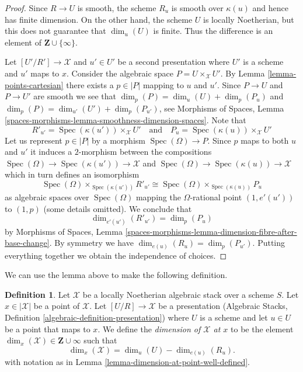 \documentclass{stacks-project}
\theoremstyle{plain}
\theoremstyle{definition}
\newtheorem{definition}[subsection]{Definition}
\theoremstyle{remark}
\numberwithin{equation}{subsection}
\def\Spec{\mathop{\mathrm{Spec}}}
\begin{document}
\begin{proof}
Since $R \to U$ is smooth, the scheme $R_u$ is smooth over $\kappa(u)$
and hence has finite dimension. On the other hand, the scheme $U$
is locally Noetherian, but this does not guarantee that
$\dim_u(U)$ is finite. Thus the difference is an element of
$\mathbf{Z} \cup \{\infty\}$.

\medskip\noindent
Let $[U'/R'] \to \mathcal{X}$ and $u' \in U'$ be a second presentation
where $U'$ is a scheme and $u'$ maps to $x$. Consider the algebraic
space $P = U \times_\mathcal{X} U'$. By
Lemma \ref{lemma-points-cartesian} there exists a $p \in |P|$ mapping to
$u$ and $u'$. Since $P \to U$ and $P \to U'$ are smooth we see that
$\dim_p(P) = \dim_u(U) + \dim_p(P_u)$ and
$\dim_p(P) = \dim_{u'}(U') + \dim_p(P_{u'})$, see
Morphisms of Spaces, Lemma
\ref{spaces-morphisms-lemma-smoothness-dimension-spaces}.
Note that
$$
R'_{u'} = \Spec(\kappa(u')) \times_\mathcal{X} U'
\quad\text{and}\quad
P_u = \Spec(\kappa(u)) \times_\mathcal{X} U'
$$
Let us represent $p \in |P|$ by a morphism $\Spec(\Omega) \to P$.
Since $p$ maps to both $u$ and $u'$ it induces a $2$-morphism
between the compositions
$\Spec(\Omega) \to \Spec(\kappa(u')) \to \mathcal{X}$ and
$\Spec(\Omega) \to \Spec(\kappa(u)) \to \mathcal{X}$
which in turn defines an isomorphism
$$
\Spec(\Omega) \times_{\Spec(\kappa(u'))} R'_{u'}
\cong
\Spec(\Omega) \times_{\Spec(\kappa(u))} P_u
$$
as algebraic spaces over $\Spec(\Omega)$ mapping the $\Omega$-rational
point $(1, e'(u'))$ to $(1, p)$ (some details omitted). We conclude that
$$
\dim_{e'(u')}(R'_{u'}) = \dim_p(P_u)
$$
by Morphisms of Spaces, Lemma
\ref{spaces-morphisms-lemma-dimension-fibre-after-base-change}.
By symmetry we have
$\dim_{e(u)}(R_u) = \dim_p(P_{u'})$.
Putting everything together we obtain the independence of choices.
\end{proof}

\noindent
We can use the lemma above to make the following definition.

\begin{definition}
\label{definition-dimension-at-point}
Let $\mathcal{X}$ be a locally Noetherian algebraic stack over a scheme $S$.
Let $x \in |\mathcal{X}|$ be a point of $\mathcal{X}$.
Let $[U/R] \to \mathcal{X}$ be a presentation
(Algebraic Stacks, Definition \ref{algebraic-definition-presentation})
where $U$ is a scheme
and let $u \in U$ be a point that maps to $x$.
We define the {\it dimension of $\mathcal{X}$ at $x$} to be
the element $\dim_x(\mathcal{X}) \in \mathbf{Z} \cup \infty$
such that 
$$
\dim_x(\mathcal{X}) = \dim_u(U)-\dim_{e(u)}(R_u).
$$
with notation as in Lemma \ref{lemma-dimension-at-point-well-defined}.
\end{definition}
\end{document}
